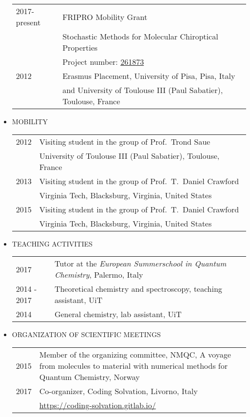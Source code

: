 \documentclass[notitlepage,a4paper,11pt]{article}
\begin{document}
\begin{itemize}
  \begin{tabular}{ll}
 2017-present & FRIPRO Mobility Grant \\
              & Stochastic Methods for Molecular Chiroptical Properties \\
              & Project number: \href{https://www.forskningsradet.no/prosjektbanken/#/project/NFR/261873}{261873} \\
 2012 & Erasmus Placement, University of Pisa, Pisa, Italy  \\
      & and University of Toulouse III (Paul Sabatier), Toulouse, France \\
  \end{tabular}

\item MOBILITY

  \begin{tabular}{ll}
 2012 & Visiting student in the group of Prof.~Trond Saue \\
     &  University of Toulouse III (Paul Sabatier), Toulouse, France \\
 2013 & Visiting student in the group of Prof.~T.~Daniel Crawford \\
      & Virginia Tech, Blacksburg, Virginia, United States \\
 2015 & Visiting student in the group of Prof.~T.~Daniel Crawford \\
      & Virginia Tech, Blacksburg, Virginia, United States \\
  \end{tabular}

\item TEACHING ACTIVITIES

  \begin{tabular}{ll}
2017 & Tutor at the \textit{European Summerschool in Quantum Chemistry}, Palermo, Italy \\
2014 - 2017  & Theoretical chemistry and spectroscopy, teaching assistant, UiT \\
2014  & General chemistry, lab assistant, UiT \\
  \end{tabular}

\item ORGANIZATION OF SCIENTIFIC MEETINGS

  \begin{tabular}{lp{12cm}}
    2015 & Member of the organizing committee, NMQC, A voyage from molecules to material with numerical methods for Quantum Chemistry, Norway \\
    2017 & Co-organizer, Coding Solvation, Livorno, Italy \\
         & \url{https://coding-solvation.gitlab.io/} \\
  \end{tabular}


\end{itemize}
\end{document}
